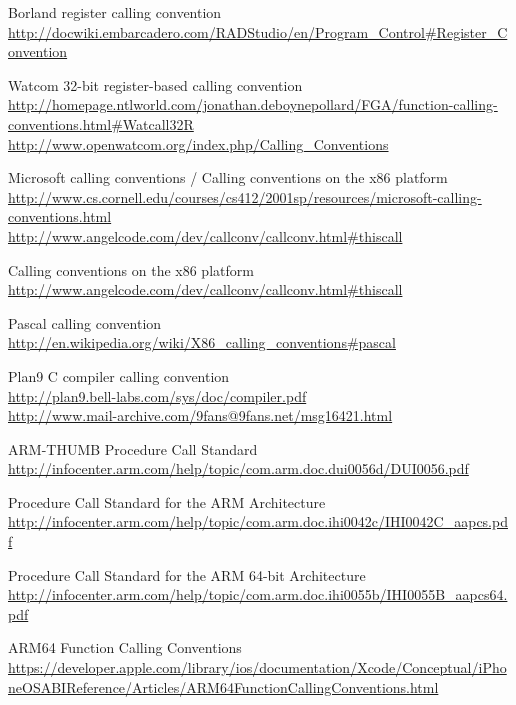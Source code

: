 \begin{thebibliography}{99}
	Borland register calling convention\\
	\url{http://docwiki.embarcadero.com/RADStudio/en/Program\_Control#Register\_Convention}

	Watcom 32-bit register-based calling convention\\
	\url{http://homepage.ntlworld.com/jonathan.deboynepollard/FGA/function-calling-conventions.html#Watcall32R}
	\url{http://www.openwatcom.org/index.php/Calling\_Conventions}

	Microsoft calling conventions / Calling conventions on the x86 platform\\
	\url{http://www.cs.cornell.edu/courses/cs412/2001sp/resources/microsoft-calling-conventions.html}\\
	\url{http://www.angelcode.com/dev/callconv/callconv.html#thiscall}

	Calling conventions on the x86 platform\\
	\url{http://www.angelcode.com/dev/callconv/callconv.html#thiscall}

	Pascal calling convention\\
	\url{http://en.wikipedia.org/wiki/X86\_calling\_conventions#pascal}%

	Plan9 C compiler calling convention\\
	\url{http://plan9.bell-labs.com/sys/doc/compiler.pdf}\\
	\url{http://www.mail-archive.com/9fans@9fans.net/msg16421.html}

	ARM-THUMB Procedure Call Standard\\
	\url{http://infocenter.arm.com/help/topic/com.arm.doc.dui0056d/DUI0056.pdf}

	Procedure Call Standard for the ARM Architecture\\
	\url{http://infocenter.arm.com/help/topic/com.arm.doc.ihi0042c/IHI0042C\_aapcs.pdf}

	Procedure Call Standard for the ARM 64-bit Architecture\\
	\url{http://infocenter.arm.com/help/topic/com.arm.doc.ihi0055b/IHI0055B\_aapcs64.pdf}

	ARM64 Function Calling Conventions\\
	\url{https://developer.apple.com/library/ios/documentation/Xcode/Conceptual/iPhoneOSABIReference/Articles/ARM64FunctionCallingConventions.html}


\end{thebibliography}
